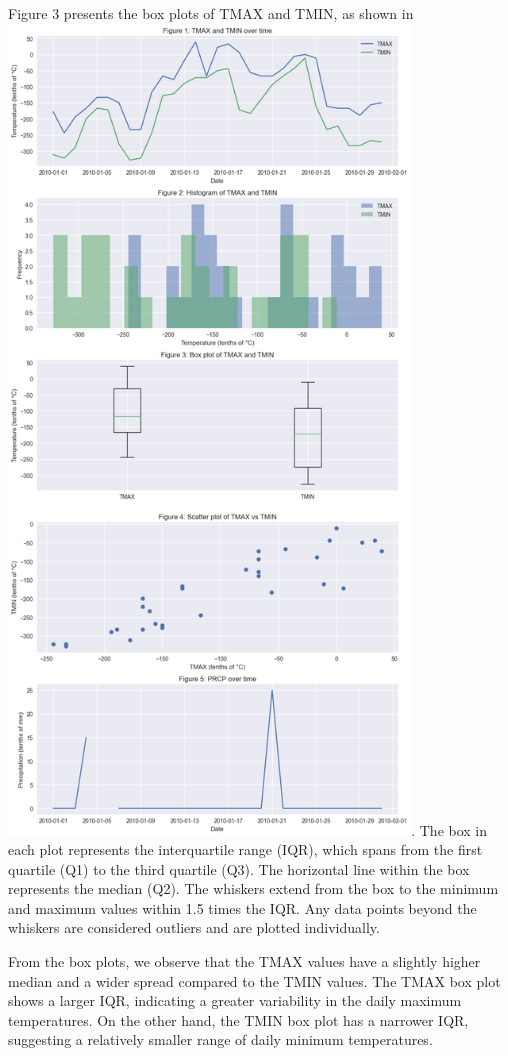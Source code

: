 \documentclass{article}
\begin{document}
Figure 3 presents the box plots of TMAX and TMIN, as shown in \includegraphics[width=0.8\textwidth]{figure_0.png}. The box in each plot represents the interquartile range (IQR), which spans from the first quartile (Q1) to the third quartile (Q3). The horizontal line within the box represents the median (Q2). The whiskers extend from the box to the minimum and maximum values within 1.5 times the IQR. Any data points beyond the whiskers are considered outliers and are plotted individually.

From the box plots, we observe that the TMAX values have a slightly higher median and a wider spread compared to the TMIN values. The TMAX box plot shows a larger IQR, indicating a greater variability in the daily maximum temperatures. On the other hand, the TMIN box plot has a narrower IQR, suggesting a relatively smaller range of daily minimum temperatures.
\end{document}
